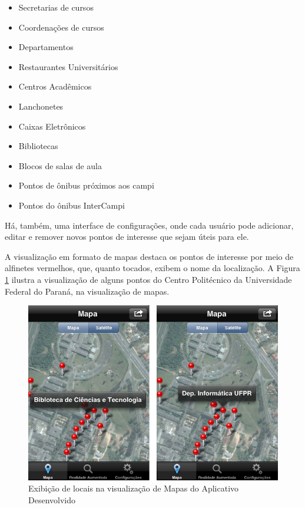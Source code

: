 \begin{itemize}
    \item Secretarias de cursos
    \item Coordenações de cursos
    \item Departamentos
    \item Restaurantes Universitários
    \item Centros Acadêmicos
    \item Lanchonetes
    \item Caixas Eletrônicos
    \item Bibliotecas
    \item Blocos de salas de aula
    \item Pontos de ônibus próximos aos campi
    \item Pontos do ônibus InterCampi
\end{itemize}



Há, também, uma interface de configurações, onde cada usuário pode adicionar, editar e remover
novos pontos de interesse que sejam úteis para ele.


A visualização em formato de mapas destaca os pontos de interesse por meio de alfinetes vermelhos,
que, quanto tocados, exibem o nome da localização. A Figura \ref{fig:pins-maps} ilustra a visualização de alguns
pontos do Centro Politécnico da Universidade Federal do Paraná, na visualização de mapas.

\begin{figure}[h!]
    \centering
    \caption{Exibição de locais na visualização de Mapas do Aplicativo Desenvolvido}
    \label{fig:pins-maps}
    \includegraphics[width=14cm]{resources/App_Maps_Screenshots/mapa-pins.png}
\end{figure}

